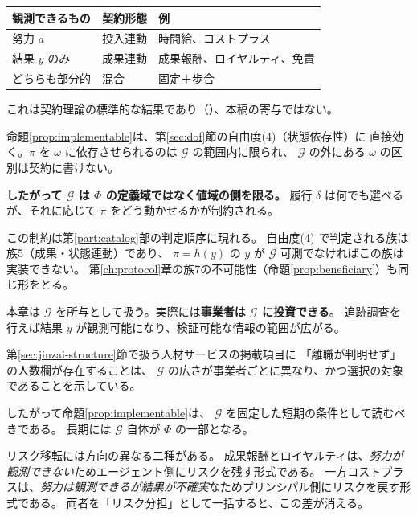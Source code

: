 \begin{center}
\begin{tabularx}{\textwidth}{@{}llX@{}}
\toprule
観測できるもの & 契約形態 & 例 \\
\midrule
努力 $a$ & 投入連動 & 時間給、コストプラス \\
結果 $y$ のみ & 成果連動 & 成果報酬、ロイヤルティ、免責 \\
どちらも部分的 & 混合 & 固定＋歩合 \\
\bottomrule
\end{tabularx}
\label{tab:observability-contracts}
\end{center}

これは契約理論の標準的な結果であり（\cite{holmstrom1979}）、本稿の寄与ではない。

\begin{remark}
\label{rem:G-limits-dof4}
命題\ref{prop:implementable}は、第\ref{sec:dof}節の自由度(4)（状態依存性）に
直接効く。$\pi$ を $\omega$ に依存させられるのは $\mathcal{G}$ の範囲内に限られ、
$\mathcal{G}$ の外にある $\omega$ の区別は契約に書けない。

\textbf{したがって $\mathcal{G}$ は $\Phi$ の定義域ではなく値域の側を限る。}
履行 $\delta$ は何でも選べるが、それに応じて $\pi$ をどう動かせるかが制約される。

この制約は第\ref{part:catalog}部の判定順序に現れる。
自由度(4) で判定される族は族5（成果・状態連動）であり、
$\pi=h(y)$ の $y$ が $\mathcal{G}$ 可測でなければこの族は実装できない。
第\ref{ch:protocol}章の族7の不可能性（命題\ref{prop:beneficiary}）も同じ形をとる。
\end{remark}

\begin{remark}
\label{rem:G-endogenous}
本章は $\mathcal{G}$ を所与として扱う。実際には\textbf{事業者は $\mathcal{G}$ に投資できる}。
追跡調査を行えば結果 $y$ が観測可能になり、検証可能な情報の範囲が広がる。

第\ref{sec:jinzai-structure}節で扱う人材サービスの掲載項目に
「離職が判明せず」の人数欄が存在することは、
$\mathcal{G}$ の広さが事業者ごとに異なり、かつ選択の対象であることを示している。

したがって命題\ref{prop:implementable}は、
$\mathcal{G}$ を固定した短期の条件として読むべきである。
長期には $\mathcal{G}$ 自体が $\Phi$ の一部となる。
\end{remark}

\begin{remark}[方向の区別]
リスク移転には方向の異なる二種がある。
成果報酬とロイヤルティは、\emph{努力が観測できない}ためエージェント側にリスクを残す形式である。
一方コストプラスは、\emph{努力は観測できるが結果が不確実}なためプリンシパル側にリスクを戻す形式である。
両者を「リスク分担」として一括すると、この差が消える。
\end{remark}

